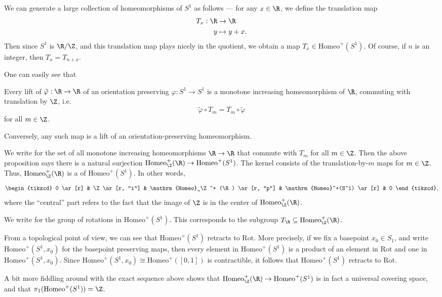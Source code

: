 \documentclass[a4paper]{article}
\newcommand\Homeo{\mathrm{Homeo}}
\newcommand\Rot{\mathrm{Rot}}
\begin{document}
We can generate a large collection of homeomorphisms of $S^1$ as follows --- for any $x \in \R$, we define the translation map
\begin{align*}
  T_x: \R &\to \R\\
  y &\mapsto y + x.
\end{align*}
Then since $S^1$ is $\R/\Z$, and this translation map plays nicely in the quotient, we obtain a map $T_x \in \Homeo^+(S^1)$. Of course, if $n$ is an integer, then $T_x = T_{n + x}$.

One can easily see that
\begin{prop}
  Every lift of $\tilde{\varphi}: \R \to \R$ of an orientation preserving $\varphi: S^1 \to S^1$ is a monotone increasing homeomorphism of $\R$, commuting with translation by $\Z$, i.e.
  \[
    \tilde{\varphi} \circ T_m = T_m \circ \tilde{\varphi}
  \]
  for all $m \in \Z$.

  Conversely, any such map is a lift of an orientation-preserving homeomorphism.
\end{prop}
We write \term{$\Homeo^+_\Z(\R)$} for the set of all monotone increasing homeomorphisms $\R \to \R$ that commute with $T_m$ for all $m \in \Z$. Then the above proposition says there is a natural surjection $\Homeo^+_\Z(\R) \to \Homeo^+(S^1)$. The kernel consists of the translation-by-$m$ maps for $m \in \Z$. Thus, $\Homeo^+_\Z(\R)$ is a  of $\Homeo^+(S^1)$. In other words, 
\[
  \begin{tikzcd}
   0 \ar[r] & \Z \ar[r, "i"] & \Homeo_\Z^+ (\R) \ar[r, "p"] & \Homeo^+(S^1) \ar[r] & 0
  \end{tikzcd},
\]
where the ``central'' part refers to the fact that the image of $\Z$ is in the center of $\Homeo_\Z^+(\R)$.

\begin{notation}
  We write \term{$\Rot$} for the group of rotations in $\Homeo^+(S^1)$. This corresponds to the subgroup $T_\R \subseteq \Homeo_\Z^+(\R)$.
\end{notation}

From a topological point of view, we can see that $\Homeo^+(S^1)$ retracts to $\Rot$. More precisely, if we fix a basepoint $x_0 \in S_1$, and write $\Homeo^+(S^1, x_0)$ for the basepoint preserving maps, then every element in $\Homeo^+(S^1)$ is a product of an element in $\Rot$ and one in $\Homeo^+(S^1, x_0)$. Since $\Homeo^+(S^1, x_0) \cong \Homeo^+([0, 1])$ is contractible, it follows that $\Homeo^+(S^1)$ retracts to $\Rot$.

A bit more fiddling around with the exact sequence above shows that $\Homeo^+_{\Z}(\R) \to \Homeo^+(S^1)$ is in fact a universal covering space, and that $\pi_1(\Homeo^+(S^1)) = \Z$.
\end{document}
